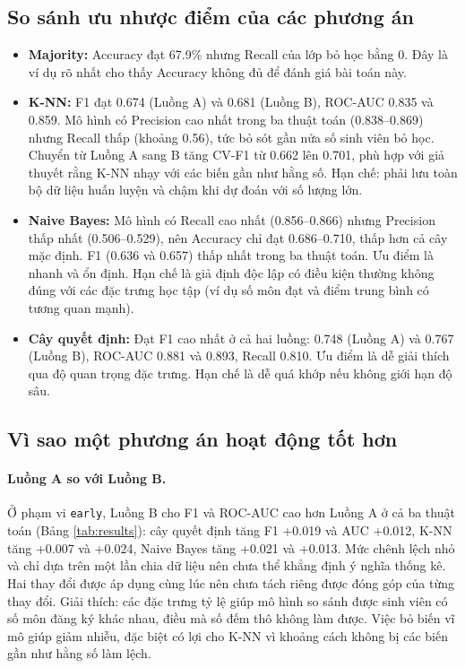 \documentclass[12pt,a4paper]{article}
\begin{document}
\subsection{So sánh ưu nhược điểm của các phương án}
\begin{itemize}
  \item \textbf{Majority:} Accuracy đạt 67.9\% nhưng Recall của lớp bỏ học bằng 0. Đây là ví dụ rõ nhất cho thấy Accuracy không đủ để đánh giá bài toán này.
  \item \textbf{K-NN:} F1 đạt 0.674 (Luồng A) và 0.681 (Luồng B), ROC-AUC 0.835 và 0.859. Mô hình có Precision cao nhất trong ba thuật toán (0.838–0.869) nhưng Recall thấp (khoảng 0.56), tức bỏ sót gần nửa số sinh viên bỏ học. Chuyển từ Luồng A sang B tăng CV-F1 từ 0.662 lên 0.701, phù hợp với giả thuyết rằng K-NN nhạy với các biến gần như hằng số. Hạn chế: phải lưu toàn bộ dữ liệu huấn luyện và chậm khi dự đoán với số lượng lớn.
  \item \textbf{Naive Bayes:} Mô hình có Recall cao nhất (0.856–0.866) nhưng Precision thấp nhất (0.506–0.529), nên Accuracy chỉ đạt 0.686–0.710, thấp hơn cả cây mặc định. F1 (0.636 và 0.657) thấp nhất trong ba thuật toán. Ưu điểm là nhanh và ổn định. Hạn chế là giả định độc lập có điều kiện thường không đúng với các đặc trưng học tập (ví dụ số môn đạt và điểm trung bình có tương quan mạnh).
  \item \textbf{Cây quyết định:} Đạt F1 cao nhất ở cả hai luồng: 0.748 (Luồng A) và 0.767 (Luồng B), ROC-AUC 0.881 và 0.893, Recall 0.810. Ưu điểm là dễ giải thích qua độ quan trọng đặc trưng. Hạn chế là dễ quá khớp nếu không giới hạn độ sâu.
\end{itemize}

\subsection{Vì sao một phương án hoạt động tốt hơn}
\paragraph{Luồng A so với Luồng B.} Ở phạm vi \texttt{early}, Luồng B cho F1 và ROC-AUC cao hơn Luồng A ở cả ba thuật toán (Bảng \ref{tab:results}): cây quyết định tăng F1 +0.019 và AUC +0.012, K-NN tăng +0.007 và +0.024, Naive Bayes tăng +0.021 và +0.013. Mức chênh lệch nhỏ và chỉ dựa trên một lần chia dữ liệu nên chưa thể khẳng định ý nghĩa thống kê. Hai thay đổi được áp dụng cùng lúc nên chưa tách riêng được đóng góp của từng thay đổi. Giải thích: các đặc trưng tỷ lệ giúp mô hình so sánh được sinh viên có số môn đăng ký khác nhau, điều mà số đếm thô không làm được. Việc bỏ biến vĩ mô giúp giảm nhiễu, đặc biệt có lợi cho K-NN vì khoảng cách không bị các biến gần như hằng số làm lệch.
\end{document}
